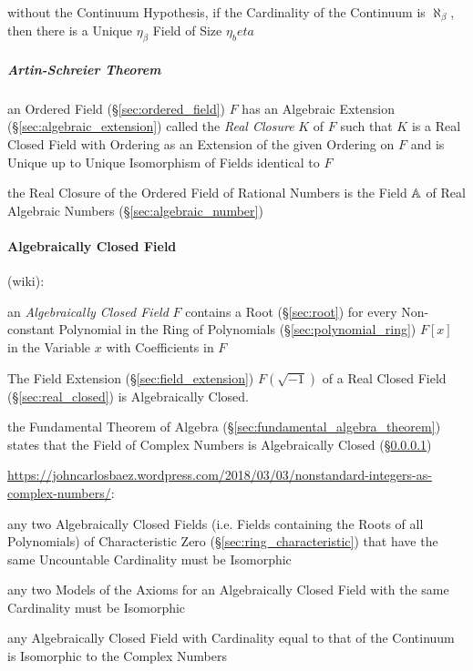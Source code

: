 \begin{itemize}
without the Continuum Hypothesis, if the Cardinality of the Continuum is
$\aleph_\beta$, then there is a Unique $\eta_\beta$ Field of Size $\eta_beta$



\subparagraph{Artin-Schreier Theorem}\label{sec:artin_schreier}\hfill

an Ordered Field (\S\ref{sec:ordered_field}) $F$ has an Algebraic Extension
(\S\ref{sec:algebraic_extension}) called the \emph{Real Closure} $K$ of $F$
such that $K$ is a Real Closed Field with Ordering as an Extension of the given
Ordering on $F$ and is Unique up to Unique Isomorphism of Fields identical to
$F$

the Real Closure of the Ordered Field of Rational Numbers is the Field
$\mathbb{A}$ of Real Algebraic Numbers (\S\ref{sec:algebraic_number})



\paragraph{Algebraically Closed Field}\label{sec:algebraically_closed}
\hfill

(wiki):

an \emph{Algebraically Closed Field} $F$ contains a
Root (\S\ref{sec:root}) for every Non-constant Polynomial in the Ring of
Polynomials (\S\ref{sec:polynomial_ring}) $F[x]$ in the Variable $x$ with
Coefficients in $F$

The Field Extension (\S\ref{sec:field_extension}) $F(\sqrt{-1})$ of a
Real Closed Field (\S\ref{sec:real_closed}) is Algebraically Closed.

the Fundamental Theorem of Algebra (\S\ref{sec:fundamental_algebra_theorem})
states that the Field of Complex Numbers is Algebraically Closed
(\S\ref{sec:algebraically_closed})

\url{https://johncarlosbaez.wordpress.com/2018/03/03/nonstandard-integers-as-complex-numbers/}:

any two Algebraically Closed Fields (i.e. Fields containing the Roots of all
Polynomials) of Characteristic Zero (\S\ref{sec:ring_characteristic}) that have
the same Uncountable Cardinality must be Isomorphic

any two Models of the Axioms for an Algebraically Closed Field with the same
Cardinality must be Isomorphic

any Algebraically Closed Field with Cardinality equal to that of the Continuum
is Isomorphic to the Complex Numbers




\end{itemize}
